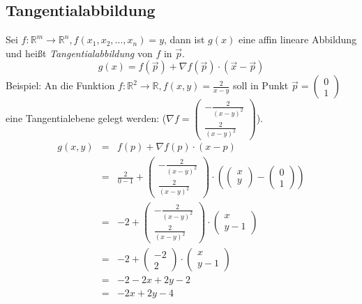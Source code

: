 \subsection{Tangentialabbildung} %
\label{sub:tangentialabbildung}
Sei $f : \mathbb{R}^m \rightarrow \mathbb{R}^n, f(x_1,x_2,...,x_n) = y$, dann ist $g(x)$ eine affin lineare Abbildung und heißt
\emph{Tangentialabbildung} von $f$ in $\overrightarrow{p}$.
\begin{equation}
	g(x) = f(\overrightarrow{p}) + \nabla f(\overrightarrow{p})\cdot(\overrightarrow{x}-\overrightarrow{p})
\end{equation}
Beispiel: An die Funktion $f : \mathbb{R}^2 \rightarrow \mathbb{R}, f(x,y) = \frac{2}{x-y}$ soll in Punkt $\overrightarrow{p} = 
\left(\begin{array}{c}0\\1\end{array}\right)$ eine Tangentialebene gelegt werden:
($\nabla f = \left(\begin{array}{c}-\frac{2}{(x-y)^2}\\\frac{2}{(x-y)^2}\end{array}\right)$). 
\begin{eqnarray*}
	g(x,y) &=& f(p) + \nabla f(p) \cdot (x-p) \\
	&=& \frac{2}{0-1} + \left(\begin{array}{c}-\frac{2}{(x-y)^2}\\\frac{2}{(x-y)^2}\end{array}\right) \cdot
	 \left(\left(\begin{array}{c}x\\y\end{array}\right) - \left(\begin{array}{c}0\\1\end{array}\right) \right) \\
	&=& -2 + \left(\begin{array}{c}-\frac{2}{(x-y)^2}\\\frac{2}{(x-y)^2}\end{array}\right) \cdot
	 \left(\begin{array}{c}x\\y-1\end{array}\right)\\
	&=& -2 + \left(\begin{array}{c}-2\\2\end{array}\right) \cdot
	  \left(\begin{array}{c}x\\y-1\end{array}\right)\\
	&=& -2-2x+2y-2 \\
	&=& -2x+2y-4
\end{eqnarray*}


